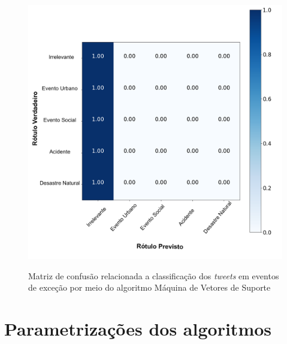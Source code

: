 \documentclass[
	12pt,				%
	oneside,			%
	a4paper,			%
	english,			%
	brazil				%
	]{abntex2ppgsi}
\begin{document}
{{\begin{apendicesenv}
\begin{figure}[!htb]
	\centering
 	  \caption{Matriz de confusão relacionada a classificação dos \textit{tweets} em eventos de exceção por meio do algoritmo Máquina de Vetores de Suporte}
		\includegraphics[width=1\linewidth]{images/confusion_matrix_svm_pt.png}
	\label{fig:confusion_matrix_svm}
\end{figure}

\chapter{Parametrizações dos algoritmos}
\label{apendiceF}


\end{apendicesenv}}}
\end{document}
